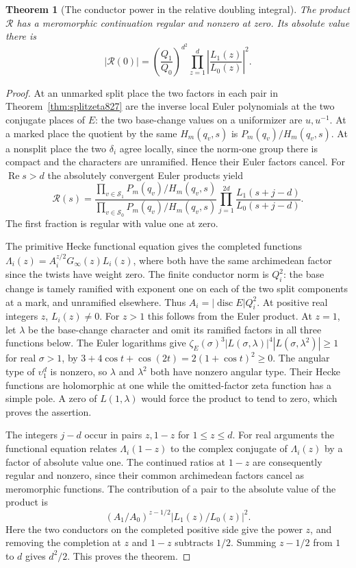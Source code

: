 \documentclass[a4paper,11pt]{article}
\newtheorem{theorem}[proposition]{Theorem}
\theoremstyle{definition}
\theoremstyle{remark}
\numberwithin{equation}{section}
\begin{document}
\begin{theorem}[The conductor power in the relative doubling integral]
\leavevmode\label{thm:squareconductor827}
The product \(\mathcal R\) has a meromorphic continuation
regular and nonzero at zero. Its absolute value there is
\[
       |\mathcal R(0)|=
        \left(\frac{Q_1}{Q_0}\right)^{d^2}
             \prod_{z=1}^d\left|\frac{L_1(z)}{L_0(z)}\right|^2 .
\]
\end{theorem}
\begin{proof}
At an unmarked split place the two factors in each pair in
Theorem~\ref{thm:splitzeta827} are the inverse local Euler
polynomials at the two conjugate places of \(E\): the two
base-change values on a uniformizer are \(u,u^{-1}\).
At a marked place the quotient by the same \(H_m(q_v,s)\)
is \(P_m(q_v)/H_m(q_v,s)\). At a nonsplit place the two
\(\delta_i\) agree locally, since the norm-one group there
is compact and the characters are unramified. Hence their
Euler factors cancel. For \(\operatorname{Re}s>d\) the
absolutely convergent Euler products yield
\[
 \mathcal R(s)=
 \frac{\prod_{v\in\mathcal S_1}P_m(q_v)/H_m(q_v,s)}
      {\prod_{v\in\mathcal S_0}P_m(q_v)/H_m(q_v,s)}
       \prod_{j=1}^{2d}\frac{L_1(s+j-d)}{L_0(s+j-d)} .
\]
The first fraction is regular with value one at zero.

The primitive Hecke functional equation gives the completed
functions \(\Lambda_i(z)=A_i^{z/2}G_\infty(z)L_i(z)\),
where both have the same archimedean factor since the twists
have weight zero. The finite conductor norm is \(Q_i^2\):
the base change is tamely ramified with exponent one on
each of the two split components at a mark, and unramified
elsewhere. Thus \(A_i=|\operatorname{disc}E|Q_i^2\). At
positive real integers \(z\), \(L_i(z)\ne0\). For \(z>1\)
this follows from the Euler product. At \(z=1\), let
\(\lambda\) be the base-change character and omit its
ramified factors in all three functions below. The Euler
logarithms give
\(\zeta_E(\sigma)^3|L(\sigma,\lambda)|^4
 |L(\sigma,\lambda^2)|\ge1\) for real \(\sigma>1\),
by \(3+4\cos t+\cos(2t)=2(1+\cos t)^2\ge0\).
The angular type of \(\upsilon_1^d\) is nonzero, so
\(\lambda\) and \(\lambda^2\) both have nonzero angular
type. Their Hecke functions are holomorphic at one while
the omitted-factor zeta function has a simple pole. A zero
of \(L(1,\lambda)\) would force the product to tend to zero,
which proves the assertion.

The integers \(j-d\) occur in pairs \(z,1-z\) for
\(1\le z\le d\). For real arguments the functional equation
relates \(\Lambda_i(1-z)\) to the complex conjugate of
\(\Lambda_i(z)\) by a factor of absolute value one.
The continued ratios at \(1-z\) are consequently regular
and nonzero, since their common archimedean factors cancel
as meromorphic functions. The contribution of a pair to
the absolute value of the product is
\[
        (A_1/A_0)^{z-1/2}\left|L_1(z)/L_0(z)\right|^2 .
\]
Here the two conductors on the completed positive side
give the power \(z\), and removing the completion at \(z\)
and \(1-z\) subtracts \(1/2\). Summing
\(z-1/2\) from \(1\) to \(d\) gives \(d^2/2\). This proves
the theorem.
\end{proof}
\end{document}
